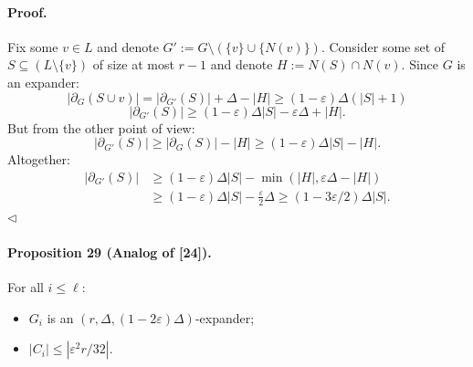 \paragraph{Proof.} Fix some $v\in L$ and denote $G':=G\setminus(\{v\}\cup\{N(v)\})$.
Consider some set of $S\subseteq(L\setminus\{v\})$ of size at most $r-1$ and denote $H:=N(S)\cap N(v)$. Since $G$ is an expander:
\[|\partial_G(S\cup v)|=|\partial_{G'}(S)|+\Delta-|H|\geq(1-\varepsilon)\Delta(|S|+1)\]
\[|\partial_{G'}(S)|\geq(1-\varepsilon)\Delta|S|-\varepsilon\Delta+|H|.\]
But from the other point of view:
\[|\partial_{G'}(S)|\geq|\partial_G(S)|-|H|\geq(1-\varepsilon)\Delta|S|-|H|.\]
Altogether:
\begin{align*}
|\partial_{G'}(S)|&\geq(1-\varepsilon)\Delta|S|-\min(|H|,\varepsilon\Delta-|H|)\\
&\geq(1-\varepsilon)\Delta|S|-\frac\varepsilon2\Delta\geq(1-3\varepsilon/2)\Delta|S|.
\end{align*}\hfill$\triangleleft$
\paragraph{Proposition 29 (Analog of [24]).} For all $i\leq\ell$:
\begin{itemize}
\item $G_i$ is an $(r,\Delta,(1-2\varepsilon)\Delta)$-expander;
\item $|C_i|\leq|\varepsilon^2r/32|$.
\end{itemize}
